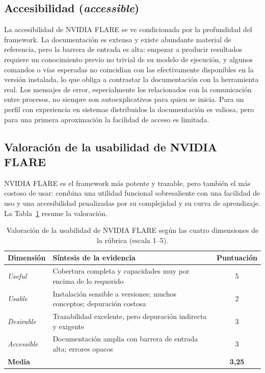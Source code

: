 \subsection{Accesibilidad (\textit{accessible})}\label{sec:usab-flare-accessible}

La accesibilidad de NVIDIA FLARE se ve condicionada por la profundidad del framework. La
documentación es extensa y existe abundante material de referencia, pero la barrera de
entrada es alta: empezar a producir resultados requiere un conocimiento previo no trivial de
su modelo de ejecución, y algunos comandos o vías esperadas no coincidían con las
efectivamente disponibles en la versión instalada, lo que obliga a contrastar la
documentación con la herramienta real. Los mensajes de error, especialmente los relacionados
con la comunicación entre procesos, no siempre son autoexplicativos para quien se inicia.
Para un perfil con experiencia en sistemas distribuidos la documentación es valiosa, pero
para una primera aproximación la facilidad de acceso es limitada.

\subsection{Valoración de la usabilidad de NVIDIA FLARE}\label{sec:usab-flare-valoracion}

NVIDIA FLARE es el framework más potente y trazable, pero también el más costoso de usar:
combina una utilidad funcional sobresaliente con una facilidad de uso y una accesibilidad
penalizadas por su complejidad y su curva de aprendizaje. La Tabla~\ref{tab:usab-flare}
resume la valoración.

\begin{table}[htbp]
  \centering
  \caption{Valoración de la usabilidad de NVIDIA FLARE según las cuatro dimensiones de la
  rúbrica (escala 1--5).}
  \label{tab:usab-flare}
  \begin{tabular}{llc}
    \toprule
    \textbf{Dimensión} & \textbf{Síntesis de la evidencia} & \textbf{Puntuación} \\
    \midrule
    \textit{Useful}     & Cobertura completa y capacidades muy por encima de lo requerido       & 5 \\
    \textit{Usable}     & Instalación sensible a versiones; muchos conceptos; depuración costosa & 2 \\
    \textit{Desirable}  & Trazabilidad excelente, pero depuración indirecta y exigente          & 3 \\
    \textit{Accessible} & Documentación amplia con barrera de entrada alta; errores opacos      & 3 \\
    \midrule
    \textbf{Media}      &                                                                       & \textbf{3{,}25} \\
    \bottomrule
  \end{tabular}
\end{table}

